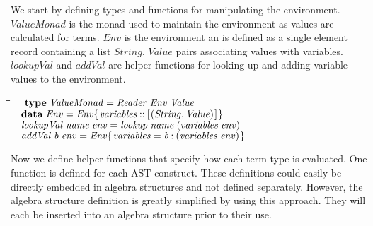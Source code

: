 \documentclass[10pt]{article}
\newlength{\lwidth}\setlength{\lwidth}{4.5cm}
\newlength{\cwidth}\setlength{\cwidth}{8mm} %
\newcommand{\Conid}[1]{\mathit{#1}}
\newcommand{\Varid}[1]{\mathit{#1}}
\begin{document}
We start by defining types and functions for manipulating the
environment.  \ensuremath{\Conid{ValueMonad}} is the monad used to maintain the
environment as values are calculated for terms.  \ensuremath{\Conid{Env}} is the
environment an is defined as a single element record containing a list
\ensuremath{\Conid{String}}, \ensuremath{\Conid{Value}} pairs associating values with variables.
\ensuremath{\Varid{lookupVal}} and \ensuremath{\Varid{addVal}} are helper functions for looking up and
adding variable values to the environment.

\begin{tabbing}
\qquad\=\hspace{\lwidth}\=\hspace{\cwidth}\=\+\kill
${\hskip1.00em\relax\mathbf{type}\;\Conid{ValueMonad}\mathrel{=}\Conid{Reader}\;\Conid{Env}\;\Conid{Value}}$\\
${}$\\
${\hskip1.00em\relax\mathbf{data}\;\Conid{Env}\mathrel{=}\Conid{Env}\{\mskip1.5mu \Varid{variables}\mathbin{::}[\mskip1.5mu (\Conid{String},\Conid{Value})\mskip1.5mu]\mskip1.5mu\}}$\\
${}$\\
${\hskip1.00em\relax\Varid{lookupVal}\;\Varid{name}\;\Varid{env}\mathrel{=}\Varid{lookup}\;\Varid{name}\;(\Varid{variables}\;\Varid{env})}$\\
${}$\\
${\hskip1.00em\relax\Varid{addVal}\;\Varid{b}\;\Varid{env}\mathrel{=}\Conid{Env}\{\mskip1.5mu \Varid{variables}\mathrel{=}\Varid{b}\mathbin{:}(\Varid{variables}\;\Varid{env})\mskip1.5mu\}}$
\end{tabbing}
Now we define helper functions that specify how each term type is
evaluated.  One function is defined for each AST construct.  These
definitions could easily be directly embedded in algebra structures
and not defined separately.  However, the algebra structure definition
is greatly simplified by using this approach.  They will each be
inserted into an algebra structure prior to their use.
\end{document}
